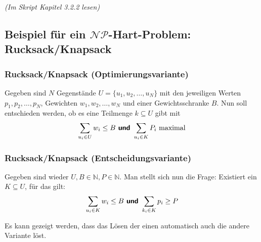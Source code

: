 \documentclass{scrartcl}%
\begin{document}
    \textit{(Im Skript Kapitel 3.2.2 lesen)}

    \subsection*{Beispiel für ein $\mathcal{N}\mathcal{P}$-Hart-Problem: Rucksack/Knapsack}
    \subsubsection*{Rucksack/Knapsack (Optimierungsvariante)}
    Gegeben sind $N$ Gegenstände $U=\{u_1,u_2,\dots,u_N\}$ mit den jeweiligen
    Werten $p_1,p_2,\dots,p_N$,
    Gewichten $w_1,w_2,\dots,w_N$ und einer
    Gewichtsschranke $B$. Nun soll entschieden werden, ob es eine Teilmenge $k \subseteq U$ gibt mit
    \begin{equation*}
        \sum_{u_i \in U} w_i \leq B \text{\textbf{\textsf{ und }}} \sum_{u_i \in K} P_i \text{ maximal}
    \end{equation*}

    \subsubsection*{Rucksack/Knapsack (Entscheidungsvariante)}
    Gegeben sind wieder $U, B \in \mathbb{N}, P \in \mathbb{N}$. Man stellt sich nun die Frage: Existiert ein $K \subseteq U$, für das gilt:
    \begin{equation*}
        \sum_{u_i \in K} w_i \leq B \text{\textbf{\textsf{ und }}} \sum_{k_i \in K} p_i \geq P
    \end{equation*}

    \vspace*{0.3cm}
    Es kann gezeigt werden, dass das Lösen der einen automatisch auch die andere Variante löst.
\end{document}
